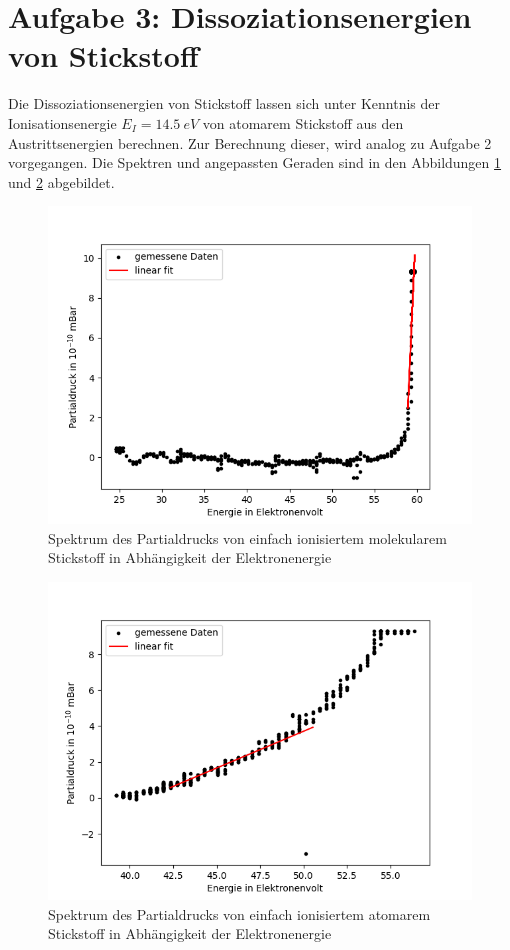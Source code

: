 \section{Aufgabe 3: Dissoziationsenergien von Stickstoff}

Die Dissoziationsenergien von Stickstoff lassen sich unter Kenntnis der Ionisationsenergie $E_I = \SI{14.5}{eV}$ von atomarem Stickstoff aus den Austrittsenergien berechnen. Zur Berechnung dieser, wird analog zu Aufgabe 2 vorgegangen. Die Spektren und angepassten Geraden sind in den Abbildungen \ref{fig:MSN2Diss} und \ref{fig:MSNDiss} abgebildet.
\begin{figure}[H]
    \centering
    \includegraphics[width=120mm,scale=0.8]{Massenspektrometer/include/MSN2Diss.png}
    \caption{Spektrum des Partialdrucks von einfach ionisiertem molekularem Stickstoff in Abhängigkeit der Elektronenergie}
    \label{fig:MSN2Diss}
\end{figure}
\begin{figure}[H]
    \centering
    \includegraphics[width=120mm,scale=0.8]{Massenspektrometer/include/MSNDiss.png}
    \caption{Spektrum des Partialdrucks von einfach ionisiertem atomarem Stickstoff in Abhängigkeit der Elektronenergie}
    \label{fig:MSNDiss}
\end{figure}
